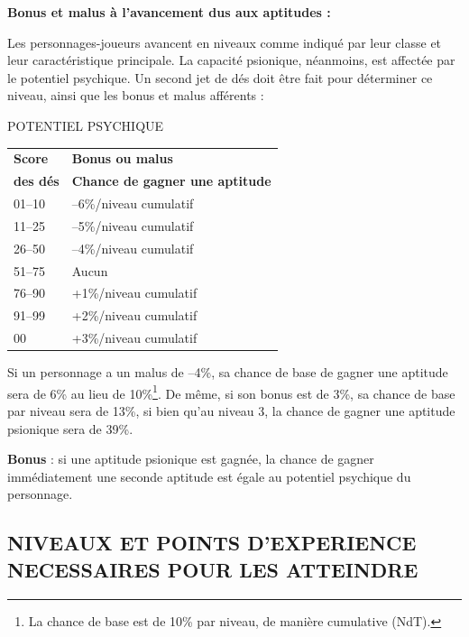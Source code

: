 {\bigskip

\textbf{Bonus et malus à l'avancement dus aux aptitudes :}

\bigskip

Les personnages-joueurs avancent en niveaux comme indiqué par leur classe et leur caractéristique principale. La capacité psionique, néanmoins, est affectée par le potentiel psychique. Un second jet de dés doit être fait pour déterminer ce niveau, ainsi que les bonus et malus afférents :

\bigskip

{\parindent3cm POTENTIEL PSYCHIQUE

\bigskip

\begin{tabular}{p{3cm}l}
\textbf{Score} & \textbf{Bonus ou malus} \\
\textbf{des dés} & \textbf{Chance de gagner une aptitude} \\
01--10 & --6\%/niveau cumulatif \\
11--25 & --5\%/niveau cumulatif \\
26--50 & --4\%/niveau cumulatif \\
51--75 & Aucun \\
76--90 & +1\%/niveau cumulatif \\
91--99 & +2\%/niveau cumulatif \\
\hspace{0.4cm}00 & +3\%/niveau cumulatif \\
\end{tabular}}

\bigskip

Si un personnage a un malus de --4\%, sa chance de base de gagner une aptitude sera de 6\% au lieu de 10\%\footnote{La chance de base est de 10\% par niveau, de manière cumulative (NdT).}. De même, si son bonus est de 3\%, sa chance de base par niveau sera de 13\%, si bien qu'au niveau 3, la chance de gagner une aptitude psionique sera de 39\%.

\bigskip

\textbf{Bonus} : si une aptitude psionique est gagnée, la chance de gagner immédiatement une seconde aptitude est égale au potentiel psychique du personnage.

\subsection*{\normalsize NIVEAUX ET POINTS D'EXPERIENCE NECESSAIRES POUR LES ATTEINDRE}

}
